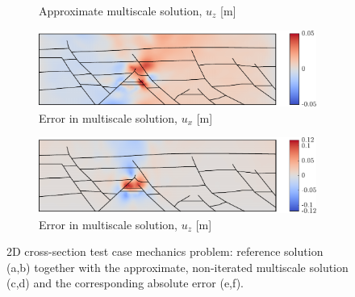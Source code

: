 \begin{figure} [htbp]
\begin{subfigure}{0.48\textwidth}
	    \caption{Approximate multiscale solution, $u_z$ [m]}
        \label{fig:cross_section_mech_sol_approx_z}
    \end{subfigure}
    \par\bigskip
    \begin{subfigure}{0.48\textwidth}
        \includegraphics[width=\linewidth]{figs/CrossSection/mech_sol_error_x}
	    \caption{Error in multiscale solution, $u_x$ [m]}
        \label{fig:cross_section_mech_sol_error_x}
    \end{subfigure}
    \hfill
    \begin{subfigure}{0.48\textwidth}
        \includegraphics[width=\linewidth]{figs/CrossSection/mech_sol_error_z}
	    \caption{Error in multiscale solution, $u_z$ [m]}
        \label{fig:cross_section_mech_sol_error_z}
    \end{subfigure}
    \caption[2D cross-section test case mechanics solutions]{2D cross-section test case mechanics problem: reference solution (a,b) together with the approximate, non-iterated multiscale solution (c,d) and the corresponding absolute error (e,f).}
    \label{fig:cross_section_mech_sol}
\end{figure}

